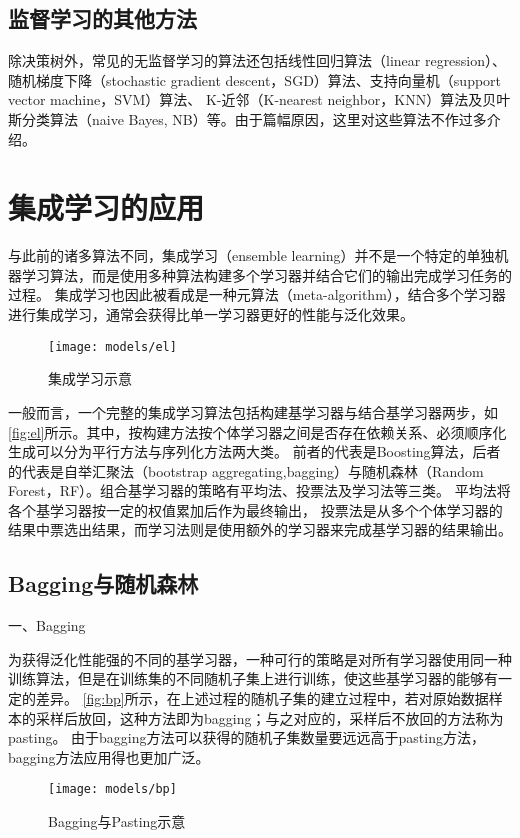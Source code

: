 \subsection{监督学习的其他方法}
除决策树外，常见的无监督学习的算法还包括线性回归算法（linear regression）、随机梯度下降（stochastic gradient descent，SGD）算法、支持向量机（support vector machine，SVM）算法、
K-近邻（K-nearest neighbor，KNN）算法及贝叶斯分类算法（naive Bayes, NB）等\cite{Zhou2016,Li2017,Liu2018,Aurélien2018}。由于篇幅原因，这里对这些算法不作过多介绍。

\section{集成学习的应用}
与此前的诸多算法不同，集成学习（ensemble learning）并不是一个特定的单独机器学习算法，而是使用多种算法构建多个学习器并结合它们的输出完成学习任务的过程\cite{Zhou2016,Aurélien2018}。
集成学习也因此被看成是一种元算法（meta-algorithm），结合多个学习器进行集成学习，通常会获得比单一学习器更好的性能与泛化效果。
\begin{figure}[htbp]
    \centering
    \texttt{[image: models/el]}
    \caption[集成学习示意]{\label{fig:el}集成学习示意}
\end{figure}

一般而言，一个完整的集成学习算法包括构建基学习器与结合基学习器两步，如\autoref{fig:el}所示。其中，按构建方法按个体学习器之间是否存在依赖关系、必须顺序化生成可以分为平行方法与序列化方法两大类\cite{Zhou2016}。
前者的代表是Boosting算法，后者的代表是自举汇聚法（bootstrap aggregating,bagging）与随机森林（Random Forest，RF）。组合基学习器的策略有平均法、投票法及学习法等三类。
平均法将各个基学习器按一定的权值累加后作为最终输出，
投票法是从多个个体学习器的结果中票选出结果，而学习法则是使用额外的学习器来完成基学习器的结果输出。

\subsection{Bagging与随机森林}
一、Bagging

为获得泛化性能强的不同的基学习器，一种可行的策略是对所有学习器使用同一种训练算法，但是在训练集的不同随机子集上进行训练，使这些基学习器的能够有一定的差异。
\autoref{fig:bp}所示，在上述过程的随机子集的建立过程中，若对原始数据样本的采样后放回，这种方法即为bagging；与之对应的，采样后不放回的方法称为pasting\cite{Aurélien2018,Zhou2016}。
由于bagging方法可以获得的随机子集数量要远远高于pasting方法，bagging方法应用得也更加广泛。
\begin{figure}[htbp]
    \centering
    \texttt{[image: models/bp]}
    \caption[Bagging与Pasting示意]{\label{fig:bp}Bagging与Pasting示意\cite{Aurélien2018}}
\end{figure}

